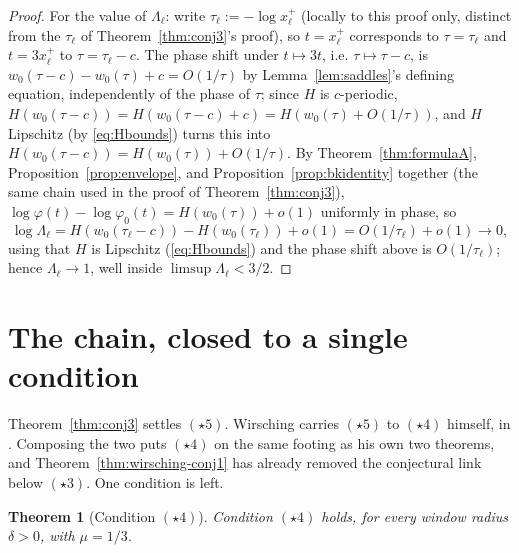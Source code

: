 \documentclass[11pt]{article}
\newtheorem{theorem}{Theorem}[section]
\theoremstyle{definition}
\theoremstyle{remark}
\begin{document}
\begin{proof}
For the value of $\Lambda_\ell$: write $\tau_\ell := -\log x_\ell^+$ (locally to this proof only, distinct
from the $\tau_\ell$ of Theorem~\ref{thm:conj3}'s proof), so $t=x_\ell^+$ corresponds to $\tau=\tau_\ell$
and $t=3x_\ell^+$ to $\tau=\tau_\ell-c$. The phase shift under $t\mapsto3t$, i.e. $\tau\mapsto\tau-c$, is
$w_0(\tau-c)-w_0(\tau)+c = O(1/\tau)$ by Lemma~\ref{lem:saddles}'s defining equation, independently
of the phase of $\tau$; since $H$ is $c$-periodic, $H(w_0(\tau-c)) = H(w_0(\tau-c)+c) =
H(w_0(\tau)+O(1/\tau))$, and $H$ Lipschitz (by \eqref{eq:Hbounds}) turns this into
$H(w_0(\tau-c)) = H(w_0(\tau)) + O(1/\tau)$. By Theorem~\ref{thm:formulaA},
Proposition~\ref{prop:envelope}, and Proposition~\ref{prop:bkidentity} together (the same chain used
in the proof of Theorem~\ref{thm:conj3}), $\log\varphi(t)-\log\varphi_0(t) = H(w_0(\tau)) + o(1)$
uniformly in phase, so
\[
\log\Lambda_\ell = H(w_0(\tau_\ell-c)) - H(w_0(\tau_\ell)) + o(1) = O(1/\tau_\ell) + o(1) \to 0,
\]
using that $H$ is Lipschitz (\eqref{eq:Hbounds}) and the phase shift above is $O(1/\tau_\ell)$; hence
$\Lambda_\ell \to 1$, well inside $\limsup \Lambda_\ell < 3/2$.
\end{proof}


\section{The chain, closed to a single condition}
\label{sec:chain-closed}

Theorem~\ref{thm:conj3} settles $(\star5)$. Wirsching carries $(\star5)$
to $(\star4)$ himself, in \cite[\S7]{Wirsching2003}. Composing the two
puts $(\star4)$ on the same footing as his own two theorems, and
Theorem~\ref{thm:wirsching-conj1} has already removed the conjectural
link below $(\star3)$. One condition is left.

\begin{theorem}[Condition $(\star4)$]\label{thm:star4}
Condition $(\star4)$ holds, for every window radius $\delta>0$, with
$\mu=1/3$.
\end{theorem}
\end{document}
